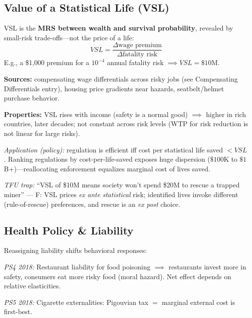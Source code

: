 \subsection{Value of a Statistical Life (VSL)}
VSL is the \textbf{MRS between wealth and survival probability}, revealed by small-risk trade-offs---not the price of a life:
$$VSL = \frac{\Delta \text{wage premium}}{\Delta \text{fatality risk}}$$
E.g., a \$1{,}000 premium for a $10^{-4}$ annual fatality risk $\implies VSL = \$10$M.

\textbf{Sources:} compensating wage differentials across risky jobs (see Compensating Differentials entry), housing price gradients near hazards, seatbelt/helmet purchase behavior.

\textbf{Properties:} VSL rises with income (safety is a normal good) $\implies$ higher in rich countries, later decades; not constant across risk levels (WTP for risk reduction is not linear for large risks).

\textit{Application (policy):} regulation is efficient iff cost per statistical life saved $< VSL$. Ranking regulations by cost-per-life-saved exposes huge dispersion ($\$100$K to $\$1$B+)---reallocating enforcement equalizes marginal cost of lives saved.

\textit{TFU trap:} ``VSL of \$10M means society won't spend \$20M to rescue a trapped miner'' --- F: VSL prices \textit{ex ante statistical} risk; identified lives invoke different (rule-of-rescue) preferences, and rescue is an \textit{ex post} choice.

\subsection{Health Policy \& Liability}
Reassigning liability shifts behavioral responses:

\textit{PS4 2018:} Restaurant liability for food poisoning $\implies$ restaurants invest more in safety, consumers eat more risky food (moral hazard). Net effect depends on relative elasticities.

\textit{PS5 2018:} Cigarette externalities: Pigouvian tax $=$ marginal external cost is first-best.
